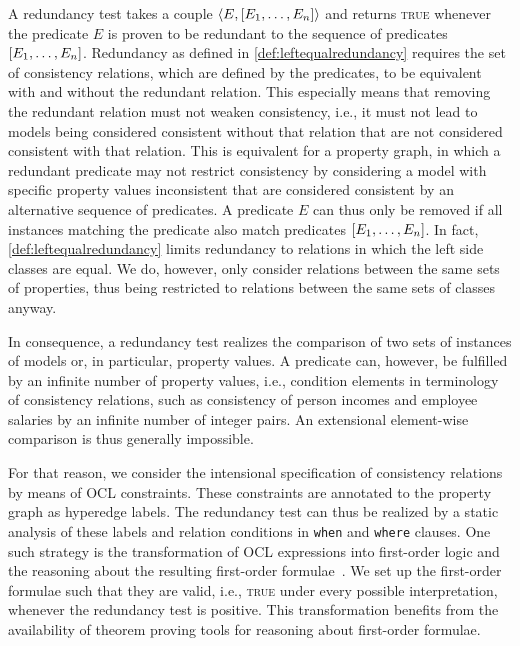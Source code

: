 
A redundancy test takes a couple $\langle E, [E_1, \dots, E_n] \rangle$ and returns \textsc{true} whenever the predicate $E$ is proven to be redundant to the sequence of predicates $[E_1, \dots, E_n]$.
Redundancy as defined in \autoref{def:leftequalredundancy} requires the set of consistency relations, which are defined by the predicates, to be equivalent with and without the redundant relation.
This especially means that removing the redundant relation must not weaken consistency, i.e., it must not lead to models being considered consistent without that relation that are not considered consistent with that relation.
This is equivalent for a property graph, in which a redundant predicate may not restrict consistency by considering a model with specific property values inconsistent that are considered consistent by an alternative sequence of predicates.
A predicate $E$ can thus only be removed if all instances matching the predicate also match predicates $[E_1, \dots, E_n]$.
In fact, \autoref{def:leftequalredundancy} limits redundancy to relations in which the left side classes are equal.
We do, however, only consider relations between the same sets of properties, thus being restricted to relations between the same sets of classes anyway.

In consequence, a redundancy test realizes the comparison of two sets of instances of models or, in particular, property values.
A predicate can, however, be fulfilled by an infinite number of property values, i.e., condition elements in terminology of consistency relations, such as consistency of person incomes and employee salaries by an infinite number of integer pairs.
An extensional element-wise comparison is thus generally impossible.

For that reason, we consider the intensional specification of consistency relations by means of OCL constraints.
These constraints are annotated to the property graph as hyperedge labels.
The redundancy test can thus be realized by a static analysis of these labels and \qvtr relation conditions in \texttt{when} and \texttt{where} clauses.
One such strategy is the transformation of OCL expressions into first-order logic and the reasoning about the resulting first-order formulae~\cite{beckert2002ocltranslation, berardi2005umlreasoning}.
We set up the first-order formulae such that they are valid, i.e., \textsc{true} under every possible interpretation, whenever the redundancy test is positive.
This transformation benefits from the availability of theorem proving tools for reasoning about first-order formulae.

